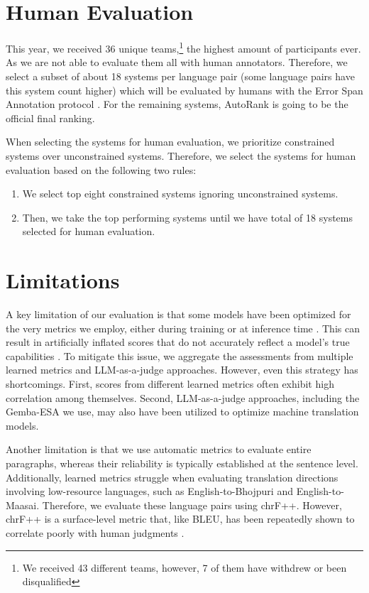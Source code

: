 \documentclass[11pt]{article}
\begin{document}
\section*{Human Evaluation}

This year, we received 36 unique teams,\footnote{We received 43 different teams, however, 7 of them have withdrew or been disqualified} the highest amount of participants ever. As we are not able to evaluate them all with human annotators.
Therefore, we select a subset of about 18 systems per language pair (some language pairs have this system count higher) which will be evaluated by humans with the Error Span Annotation protocol \citep{kocmi2024errorspanannotationbalanced}.
For the remaining systems, AutoRank is going to be the official final ranking.

When selecting the systems for human evaluation, we prioritize constrained systems over unconstrained systems.
Therefore, we select the systems for human evaluation based on the following two rules:

\begin{enumerate}[noitemsep]
\item We select top eight constrained systems ignoring unconstrained systems.
\item Then, we take the top performing systems until we have total of 18 systems selected for human evaluation.
\end{enumerate}




\section*{Limitations}


A key limitation of our evaluation is that some models have been optimized for the very metrics we employ, either during training or at inference time \cite{freitag-etal-2022-high, finkelstein2024mbr}. This can result in artificially inflated scores that do not accurately reflect a model's true capabilities \cite{kovacs-etal-2024-mitigating}. To mitigate this issue, we aggregate the assessments from multiple learned metrics and LLM-as-a-judge approaches. However, even this strategy has shortcomings. First, scores from different learned metrics often exhibit high correlation among themselves. Second, LLM-as-a-judge approaches, including the Gemba-ESA we use, may also have been utilized to optimize machine translation models.

Another limitation is that we use automatic metrics to evaluate entire paragraphs, whereas their reliability is typically established at the sentence level. Additionally, learned metrics struggle when evaluating translation directions involving low-resource languages, such as English-to-Bhojpuri and English-to-Maasai. Therefore, we evaluate these language pairs using chrF++. However, chrF++ is a surface-level metric that, like BLEU, has been repeatedly shown to correlate poorly with human judgments \citep{kocmi-etal-2021-ship, freitag-etal-2022-results, freitag-etal-2023-results}.
\end{document}
